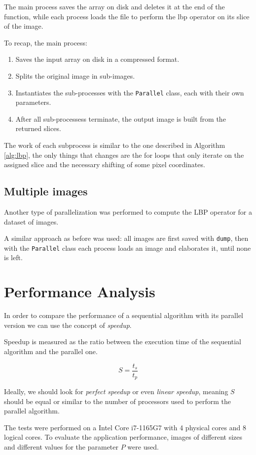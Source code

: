 \documentclass[10pt,twocolumn,letterpaper]{article}
\begin{document}
The main process saves the array on disk and deletes it at the end of the function, while each process loads the file to perform the lbp operator on its slice of the image. 

To recap, the main process:

\begin{enumerate}
	\item Saves the input array on disk in a compressed format.
	\item Splits the original image in sub-images.
	\item Instantiates the sub-processes with the \verb"Parallel" class, each with their own parameters.
	\item After all sub-processess terminate, the output image is built from the returned slices.
\end{enumerate}

The work of each subprocess is similar to the one described in Algorithm \ref{alg:lbp}, the only things that changes are the for loops that only iterate on the assigned slice and the necessary shifting of some pixel coordinates. 

\subsection{Multiple images}

Another type of parallelization was performed to compute the LBP operator for a dataset of images.

A similar approach as before was used: all images are first saved with \verb"dump", then with the \verb"Parallel" class each process loads an image and elaborates it, until none is left.

\section{Performance Analysis}
In order to compare the performance of a sequential algorithm with its parallel version we can use the concept of \textit{speedup}.

Speedup is measured as the ratio between the execution time of the sequential algorithm and the parallel one.

\[S = \frac{t_s}{t_p}\]

Ideally, we should look for \textit{perfect speedup} or even \textit{linear speedup}, meaning $S$ should be equal or similar to the number of processors used to perform the parallel algorithm.

The tests were performed on a Intel Core i7-1165G7 with 4 physical cores and 8 logical cores. To evaluate the application performance, images of different sizes and different values for the parameter $P$ were used.
\end{document}
